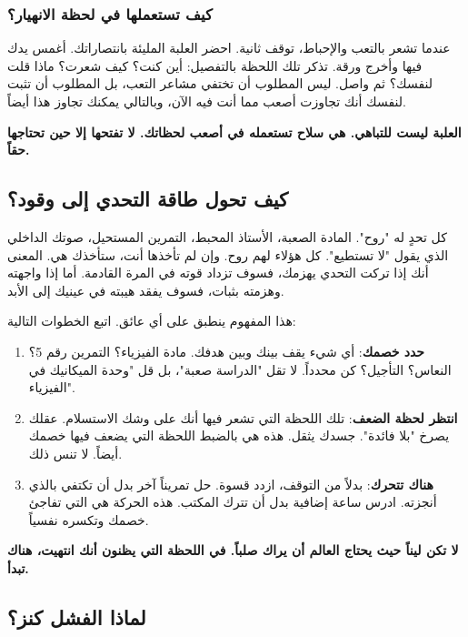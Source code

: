 \documentclass[12pt,a4paper]{book}
\newcommand{\importantAr}[1]{%
	\begin{important}
		\bfseries #1
	\end{important}
}
\begin{document}
	\subsubsection*{كيف تستعملها في لحظة الانهيار؟}
	
	عندما تشعر بالتعب والإحباط، توقف ثانية. احضر العلبة المليئة بانتصاراتك. أغمس يدك فيها وأخرج ورقة. تذكر تلك اللحظة بالتفصيل: أين كنت؟ كيف شعرت؟ ماذا قلت لنفسك؟ ثم واصل. ليس المطلوب أن تختفي مشاعر التعب، بل المطلوب أن تثبت لنفسك أنك تجاوزت أصعب مما أنت فيه الآن، وبالتالي يمكنك تجاوز هذا أيضاً.
	
	\importantAr{العلبة ليست للتباهي. هي سلاح تستعمله في أصعب لحظاتك. لا تفتحها إلا حين تحتاجها حقاً.}
	
	\subsection{كيف تحول طاقة التحدي إلى وقود؟}
	\label{subsec:taking-souls}
	
	كل تحدٍ له "روح". المادة الصعبة، الأستاذ المحبط، التمرين المستحيل، صوتك الداخلي الذي يقول "لا تستطيع". كل هؤلاء لهم روح. وإن لم تأخذها أنت، ستأخذك هي. المعنى أنك إذا تركت التحدي يهزمك، فسوف تزداد قوته في المرة القادمة. أما إذا واجهته وهزمته بثبات، فسوف يفقد هيبته في عينيك إلى الأبد.
	
	هذا المفهوم ينطبق على أي عائق. اتبع الخطوات التالية:
	
	\begin{enumerate}
		\item \textbf{حدد خصمك}: أي شيء يقف بينك وبين هدفك. مادة الفيزياء؟ التمرين رقم 5؟ النعاس؟ التأجيل؟ كن محدداً. لا تقل "الدراسة صعبة"، بل قل "وحدة الميكانيك في الفيزياء".
		\item \textbf{انتظر لحظة الضعف}: تلك اللحظة التي تشعر فيها أنك على وشك الاستسلام. عقلك يصرخ "بلا فائدة". جسدك يثقل. هذه هي بالضبط اللحظة التي يضعف فيها خصمك أيضاً. لا تنس ذلك.
		\item \textbf{هناك تتحرك}: بدلاً من التوقف، ازدد قسوة. حل تمريناً آخر بدل أن تكتفي بالذي أنجزته. ادرس ساعة إضافية بدل أن تترك المكتب. هذه الحركة هي التي تفاجئ خصمك وتكسره نفسياً.
	\end{enumerate}
	
	\importantAr{لا تكن ليناً حيث يحتاج العالم أن يراك صلباً. في اللحظة التي يظنون أنك انتهيت، هناك تبدأ.}
	
	\subsection{لماذا الفشل كنز؟}
	\label{subsec:empower-failure}
	
\end{document}
